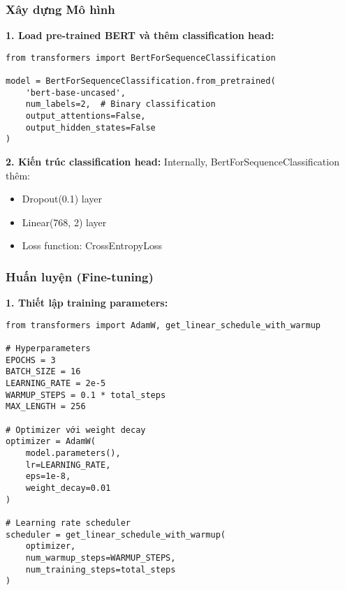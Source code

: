 \subsubsection{Xây dựng Mô hình}

\textbf{1. Load pre-trained BERT và thêm classification head:}
\begin{verbatim}
from transformers import BertForSequenceClassification

model = BertForSequenceClassification.from_pretrained(
    'bert-base-uncased',
    num_labels=2,  # Binary classification
    output_attentions=False,
    output_hidden_states=False
)
\end{verbatim}

\textbf{2. Kiến trúc classification head:}
Internally, BertForSequenceClassification thêm:
\begin{itemize}
    \item Dropout(0.1) layer
    \item Linear(768, 2) layer
    \item Loss function: CrossEntropyLoss
\end{itemize}

\subsubsection{Huấn luyện (Fine-tuning)}

\textbf{1. Thiết lập training parameters:}
\begin{verbatim}
from transformers import AdamW, get_linear_schedule_with_warmup

# Hyperparameters
EPOCHS = 3
BATCH_SIZE = 16
LEARNING_RATE = 2e-5
WARMUP_STEPS = 0.1 * total_steps
MAX_LENGTH = 256

# Optimizer với weight decay
optimizer = AdamW(
    model.parameters(),
    lr=LEARNING_RATE,
    eps=1e-8,
    weight_decay=0.01
)

# Learning rate scheduler
scheduler = get_linear_schedule_with_warmup(
    optimizer,
    num_warmup_steps=WARMUP_STEPS,
    num_training_steps=total_steps
)
\end{verbatim}

